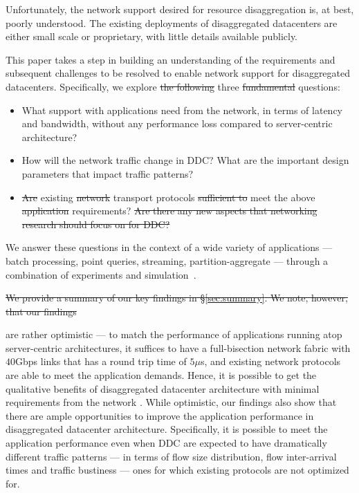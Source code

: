 Unfortunately, the network support desired for resource disaggregation is, at best, poorly understood. The existing deployments of disaggregated datacenters are either small scale or proprietary, with little details available publicly. 


This paper takes a step in building an understanding of the requirements and subsequent challenges to be resolved to enable network support for disaggregated datacenters. 
Specifically, we explore \st{the following} three \st{fundamental} questions: 

\begin{itemize}[leftmargin=*]
	\itemsep0em
		\item What support with applications need from the network, in terms of latency and bandwidth, without any performance loss compared to server-centric architecture? 
	\item How will the network traffic change in DDC? What are the important design parameters that impact traffic patterns?
    \item \st{Are}  existing \st{network} transport protocols \st{sufficient to} meet the above \st{application} requirements? \st{Are there any new aspects that networking research should focus on for DDC?} 
\end{itemize}
We answer these questions in the context of a wide variety of applications --- batch processing, point queries, streaming, partition-aggregate --- through a combination of experiments and simulation~\cite{mongo, elastic}.

\st{We provide a summary of our key findings in \S\ref{sec:summary}. We note, however, that our findings}


are rather optimistic  --- to match  the performance of applications running atop server-centric architectures, it suffices to have a full-bisection network fabric with $40$Gbps links that has a round trip time of $5\mu$s, and existing network protocols are able to meet the application demands. Hence, it is possible to get the qualitative benefits of disaggregated datacenter architecture with minimal requirements from the network . While optimistic, our findings also show that there are ample opportunities to improve the application performance in disaggregated datacenter architecture.  Specifically, it is possible to meet the application performance even when DDC are expected to have dramatically different traffic patterns --- in terms of flow size distribution, flow inter-arrival times and traffic bustiness --- ones for which existing protocols are not optimized for.  


